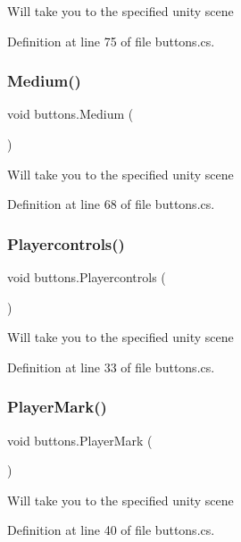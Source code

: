 Will take you to the specified unity scene 

Definition at line 75 of file buttons.\+cs.

\mbox{\label{classbuttons_a453a7891097123efba33130f4c3a4b34}} 
\subsubsection{\texorpdfstring{Medium()}{Medium()}}
{\footnotesize\ttfamily void buttons.\+Medium (\begin{DoxyParamCaption}{ }\end{DoxyParamCaption})}

Will take you to the specified unity scene 

Definition at line 68 of file buttons.\+cs.

\mbox{\label{classbuttons_abfbc76ac209b478e06ca5838794aee6b}} 
\subsubsection{\texorpdfstring{Playercontrols()}{Playercontrols()}}
{\footnotesize\ttfamily void buttons.\+Playercontrols (\begin{DoxyParamCaption}{ }\end{DoxyParamCaption})}

Will take you to the specified unity scene 

Definition at line 33 of file buttons.\+cs.

\mbox{\label{classbuttons_a7b6e43f9515af9731e0b3bb0024c61a1}} 
\subsubsection{\texorpdfstring{PlayerMark()}{PlayerMark()}}
{\footnotesize\ttfamily void buttons.\+Player\+Mark (\begin{DoxyParamCaption}{ }\end{DoxyParamCaption})}

Will take you to the specified unity scene 

Definition at line 40 of file buttons.\+cs.


